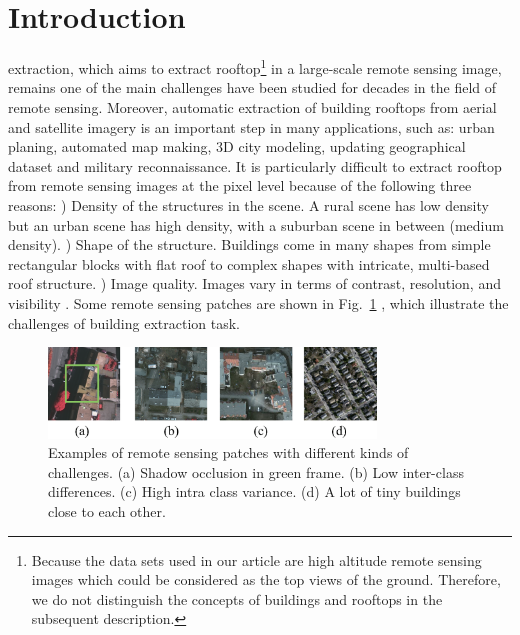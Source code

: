 %
\section{Introduction}
\label{sec:intro}



 extraction, which aims to extract rooftop\footnote{Because the data sets used in our article are high altitude remote sensing images which could be considered as the top views of the ground. Therefore, we do not distinguish the concepts of buildings and rooftops in the subsequent description.} in a large-scale remote sensing image, remains one of the main challenges have been studied for decades in the field of remote sensing. Moreover, automatic extraction of building rooftops from aerial and satellite imagery is an important step in many applications, such as: urban planing, automated map making, 3D city modeling, updating geographical dataset and military reconnaissance. It is particularly difficult to extract rooftop from remote sensing images at the pixel level because of the following three reasons: ) Density of the structures in the scene. A rural scene has low density but an urban scene has high density, with a suburban scene in between (medium density).  ) Shape of the structure. Buildings come in many shapes from simple rectangular blocks with flat roof to complex shapes with intricate, multi-based roof structure.  ) Image quality. Images vary in terms of contrast, resolution, and visibility  \cite{IEEEexample:huertas1988detecting}. Some remote sensing patches are shown in Fig.~\ref{fig:intro}  , which illustrate the challenges of building extraction task.


\begin{figure}
\includegraphics[width=8.7cm]{Figures/challenge.eps}
\caption{Examples of remote sensing patches with different kinds of challenges. (a) Shadow occlusion in green frame. (b) Low inter-class differences. (c) High intra class variance. (d) A lot of tiny buildings close to each other.}
\label{fig:intro}
\end{figure}



